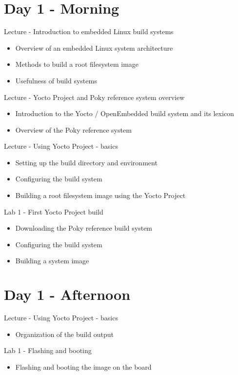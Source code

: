 \documentclass[a4paper,12pt,obeyspaces,spaces,hyphens]{article}
\begin{document}
\section{Day 1 - Morning}

\feagendaonecolumn
{Lecture - Introduction to embedded Linux build systems}
{
  \begin{itemize}
  \item Overview of an embedded Linux system architecture
  \item Methods to build a root filesystem image
  \item Usefulness of build systems
  \end{itemize}
}

\feagendaonecolumn
{Lecture - Yocto Project and Poky reference system overview}
{
  \begin{itemize}
  \item Introduction to the Yocto / OpenEmbedded build system and its lexicon
  \item Overview of the Poky reference system
  \end{itemize}
}

\feagendatwocolumn
{Lecture - Using Yocto Project - basics}
{
  \begin{itemize}
  \item Setting up the build directory and environment
  \item Configuring the build system
  \item Building a root filesystem image using the Yocto Project
  \end{itemize}
}
{Lab 1 - First Yocto Project build}
{
  \begin{itemize}
  \item Downloading the Poky reference build system
  \item Configuring the build system
  \item Building a system image
 \end{itemize}
}

\section{Day 1 - Afternoon}

\feagendatwocolumn
{Lecture - Using Yocto Project - basics}
{
  \begin{itemize}
  \item Organization of the build output
  \end{itemize}
}
{Lab 1 - Flashing and booting}
{
  \begin{itemize}
  \item Flashing and booting the image on the board
  \end{itemize}
}
\end{document}
